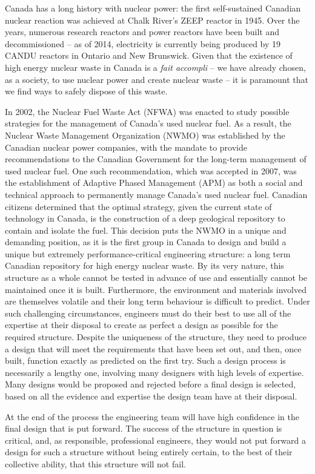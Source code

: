 Canada has a long history with nuclear power: the first self-sustained Canadian nuclear reaction was achieved at Chalk River's ZEEP reactor in 1945. Over the years, numerous research reactors and power reactors have been built and decommissioned -- as of 2014, electricity is currently being produced by 19 CANDU reactors in Ontario and New Brunswick. Given that the existence of high energy nuclear waste in Canada is a \emph{fait accompli} -- we have already chosen, as a society, to use nuclear power and create nuclear waste --  it is paramount that we find ways to safely dispose of this waste. 
\par
In 2002, the Nuclear Fuel Waste Act (NFWA) was enacted to study possible strategies for the management of Canada's used nuclear fuel. As a result, the Nuclear Waste Management Organization (NWMO) was established by the Canadian nuclear power companies, with the mandate to provide recommendations to the Canadian Government for the long-term management of used nuclear fuel. One such recommendation, which was accepted in 2007, was the establishment of Adaptive Phased Management (APM) as both a social and technical approach to permanently manage Canada's used nuclear fuel. Canadian citizens determined that the optimal strategy, given the current state of technology in Canada, is the construction of a deep geological repository to contain and isolate the fuel.
\newl
This decision puts the NWMO in a unique and demanding position, as it is the first group in Canada to design and build a unique but extremely performance-critical engineering structure: a long term Canadian repository for high energy nuclear waste. By its very nature, this structure as a whole cannot be tested in advance of use and essentially cannot be maintained once it is built. Furthermore, the environment and materials involved are themselves volatile and their long term behaviour is difficult to predict.
\newl 
Under such challenging circumstances, engineers must do their best to use all of the expertise at their disposal to create as perfect a design as possible for the required structure. Despite the uniqueness of the structure, they need to produce a design that will meet the requirements that have been set out, and then, once built, function exactly as predicted on the first try.  Such a design process is necessarily a lengthy one, involving many designers with high levels of expertise. Many designs would be proposed and rejected before a final design is selected, based on all the evidence and expertise the design team have at their disposal.
\par
At the end of the process the engineering team will have high confidence in the final design that is put forward. The success of the structure in question is critical, and, as responsible, professional engineers, they would not put forward a design for such a structure without being entirely certain, to the best of their collective ability, that this structure will not fail.

